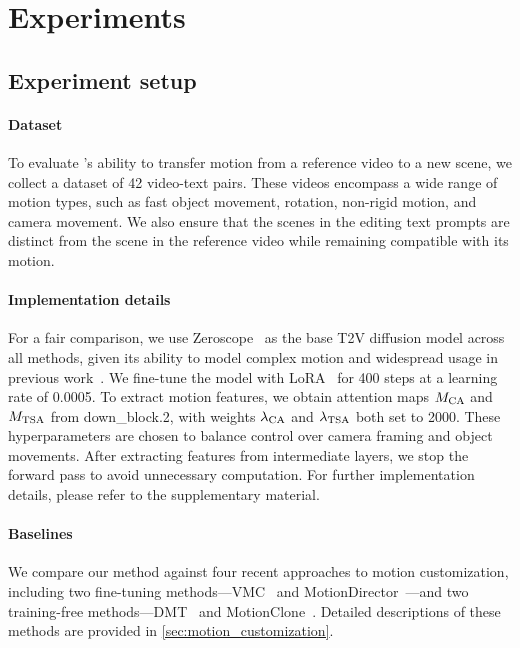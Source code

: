 \section{Experiments}
\label{sec:experiments}

\subsection{Experiment setup}
\label{sec:setup}

\paragraph{Dataset}
To evaluate {\ours}'s ability to transfer motion from a reference video to a new scene, we collect a dataset of 42 video-text pairs. These videos encompass a wide range of motion types, such as fast object movement, rotation, non-rigid motion, and camera movement. We also ensure that the scenes in the editing text prompts are distinct from the scene in the reference video while remaining compatible with its motion.

\paragraph{Implementation details}
 For a fair comparison, we use Zeroscope~\cite{zeroscope} as the base T2V diffusion model across all methods, given its ability to model complex motion and widespread usage in previous work~\cite{md,dmt,sma}. We fine-tune the model with LoRA~\cite{lora} for 400 steps at a learning rate of 0.0005. To extract motion features, we obtain attention maps $M_{{\rm CA}}$ and $M_{{\rm TSA}}$ from down\_block.2, with weights $\lambda_{{\rm CA}}$ and $\lambda_{{\rm TSA}}$ both set to 2000. These hyperparameters are chosen to balance control over camera framing and object movements. After extracting features from intermediate layers, we stop the forward pass to avoid unnecessary computation. For further implementation details, please refer to the supplementary material.

\paragraph{Baselines}
We compare our method against four recent approaches to motion customization, including two fine-tuning methods---VMC~\cite{vmc} and MotionDirector~\cite{md}---and two training-free methods---DMT~\cite{dmt} and MotionClone~\cite{mc}. Detailed descriptions of these methods are provided in \cref{sec:motion_customization}.

